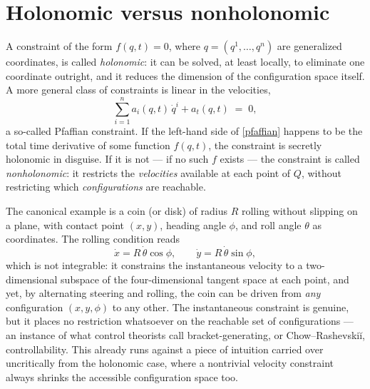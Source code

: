 \section{Holonomic versus nonholonomic}

A constraint of the form $f(q,t)=0$, where $q=(q^1,\dots,q^n)$ are
generalized coordinates, is called \emph{holonomic}: it can be
solved, at least locally, to eliminate one coordinate outright, and
it reduces the dimension of the configuration space itself. A more
general class of constraints is linear in the velocities,
\begin{equation}
  \sum_{i=1}^n a_i(q,t)\,\dot q^i + a_t(q,t) \;=\;0,
  \label{pfaffian}
\end{equation}
a so-called Pfaffian constraint. If the left-hand side of
\eqref{pfaffian} happens to be the total time derivative of some
function $f(q,t)$, the constraint is secretly holonomic in disguise.
If it is not --- if no such $f$ exists --- the constraint is called
\emph{nonholonomic}: it restricts the \emph{velocities} available at
each point of $Q$, without restricting which \emph{configurations}
are reachable.

The canonical example is a coin (or disk) of radius $R$ rolling
without slipping on a plane, with contact point $(x,y)$, heading
angle $\phi$, and roll angle $\theta$ as coordinates. The
rolling condition reads
\begin{equation}
  \dot x = R\,\dot\theta\cos\phi ,\qquad
  \dot y = R\,\dot\theta\sin\phi ,
  \label{eq:rolling-coin}
\end{equation}
which is not integrable: it constrains the instantaneous velocity to
a two-dimensional subspace of the four-dimensional tangent space at
each point, and yet, by alternating steering and rolling, the coin
can be driven from \emph{any} configuration $(x,y,\phi)$ to any
other. The instantaneous constraint is genuine, but it places no
restriction whatsoever on the reachable set of configurations --- an
instance of what control theorists call bracket-generating, or
Chow--Rashevski\u{i}, controllability. This already runs against a
piece of intuition carried over uncritically from the holonomic
case, where a nontrivial velocity constraint always shrinks the
accessible configuration space too.

